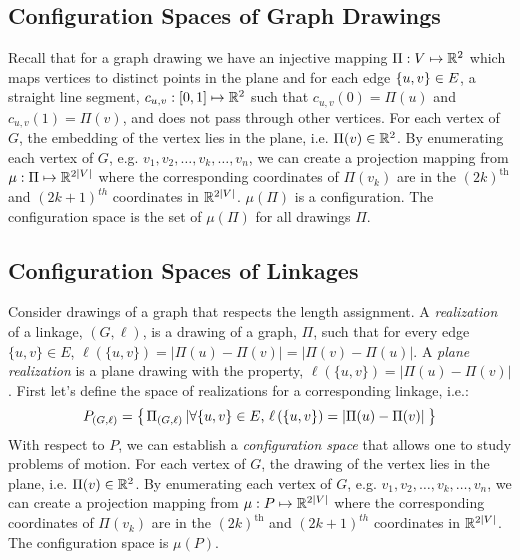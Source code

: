 \subsection{Configuration Spaces of Graph Drawings}
Recall that for a graph drawing we have an injective mapping $\Pi : V \mapsto {\mathbb{R}}^{2}$ which maps vertices to distinct points in the plane and for each edge $\left\lbrace u,v \right\rbrace \in E$, a straight line segment, $c_{u,v}:[0,1]\mapsto {\mathbb{R}}^2$ such that $c_{u,v}(0) = \Pi(u)$ and $c_{u,v}(1) = \Pi(v)$, and does not pass through other vertices.
For each vertex of $G$, the embedding of the vertex lies in the plane, i.e. $\Pi(v) \in {\mathbb{R}}^2$.  
By enumerating each vertex of $G$, e.g. $v_1, v_2, \dots, v_k, \dots, v_{n}$, we can create a projection mapping from $\mu: \Pi \mapsto {\mathbb{R}}^{2\vert V \vert}$ where the corresponding coordinates of $\Pi(v_k)$ are in the $(2k)^\text{th}$ and $(2k+1)^{th}$ coordinates in ${\mathbb{R}}^{2\vert V \vert}$.  
$\mu(\Pi)$ is a configuration.
The configuration space is the set of $\mu(\Pi)$ for all drawings $\Pi$.  

\subsection{Configuration Spaces of Linkages}

Consider drawings of a graph that respects the length assignment.  
A \textit{realization} of a linkage, $(G,\ell)$, is a drawing of a graph, $\Pi$, such that for every edge $\{u,v\} \in E$, $\ell\left( \{u,v\} \right) = \left\vert \Pi(u) - \Pi(v) \right\vert = \left\vert \Pi(v) - \Pi(u) \right\vert$. 
A \textit{plane realization} is a plane drawing with the property, $\ell\left( \{u,v\} \right) = \left\vert \Pi(u) - \Pi(v) \right\vert$.
First let's define the space of realizations for a corresponding linkage, i.e.:
$$P_{(G,\ell)} = {\left\lbrace \left. \Pi_{(G,\ell)} \left\vert \forall \{u,v\} \in E\text{, }\ell\left( \{u,v\} \right) = \left\vert \Pi(u) - \Pi(v) \right\vert \right.\right.\right\rbrace }$$
With respect to $P$, we can establish a \textit{configuration space} that allows one to study problems of motion.  For each vertex of $G$, the drawing of the vertex lies in the plane, i.e. $\Pi(v) \in {\mathbb{R}}^2$.  
By enumerating each vertex of $G$, e.g. $v_1, v_2, \dots, v_k, \dots, v_{n}$, we can create a projection mapping from $\mu: P \mapsto {\mathbb{R}}^{2\vert V \vert}$ where the corresponding coordinates of $\Pi(v_k)$ are in the $(2k)^\text{th}$ and $(2k+1)^{th}$ coordinates in ${\mathbb{R}}^{2\vert V \vert}$.  
The configuration space is $\mu(P)$.  


